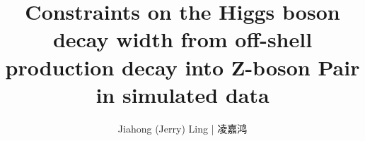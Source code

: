 

\title{Constraints on the Higgs boson decay width from off-shell production decay into
Z-boson Pair in simulated data}

\author{Jiahong (Jerry) Ling | 凌嘉鸿}

   


